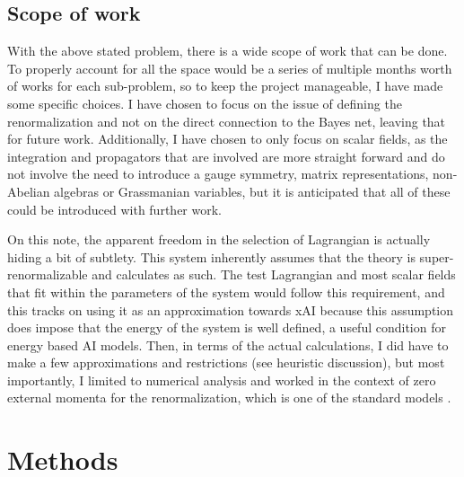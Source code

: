 \documentclass{article}
\begin{document}
\subsection{Scope of work}
\hspace{0.5 cm} With the above stated problem, there is a wide scope of work that can be done. 
To properly account for all the space would be a series of multiple months worth of works for each sub-problem, so to keep the project manageable, I have made some specific choices. 
I have chosen to focus on the issue of defining the renormalization and not on the direct connection to the Bayes net, leaving that for future work. 
Additionally, I have chosen to only focus on scalar fields, as the integration and propagators that are involved are more straight forward and do not involve the need to introduce a gauge symmetry, matrix representations, non-Abelian algebras or Grassmanian variables, but it is anticipated that all of these could be introduced with further work. 

\hspace{0.5 cm}On this note, the apparent freedom in the selection of Lagrangian is actually hiding a bit of subtlety. 
This system inherently assumes that the theory is super-renormalizable and calculates as such. The test Lagrangian and most scalar fields that fit within the parameters of the system would follow this requirement, and this tracks on using it as an approximation towards xAI because this assumption does impose that the energy of the system is well defined, a useful condition for energy based AI models.
Then, in terms of the actual calculations, I did have to make a few approximations and restrictions (see heuristic discussion), but most importantly, I limited to numerical analysis and worked in the context of zero external momenta for the renormalization, which is one of the standard models \cite{PS} \cite{2009} \cite{Aharony2019} \cite{Myers1996}. 
\section{Methods}
\end{document}
